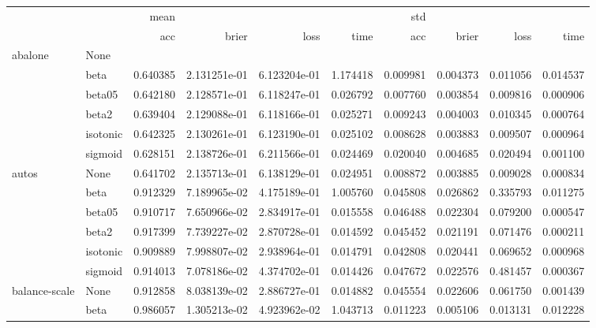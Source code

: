 \begin{tabular}{llrrrrrrrr}
\toprule
        &      &      mean &               &               &            &       std &           &           &           \\
        &      &       acc &         brier &          loss &       time &       acc &     brier &      loss &      time \\
\midrule
abalone & None &           &               &               &            &           &           &           &           \\
        & beta &  0.640385 &  2.131251e-01 &  6.123204e-01 &   1.174418 &  0.009981 &  0.004373 &  0.011056 &  0.014537 \\
        & beta05 &  0.642180 &  2.128571e-01 &  6.118247e-01 &   0.026792 &  0.007760 &  0.003854 &  0.009816 &  0.000906 \\
        & beta2 &  0.639404 &  2.129088e-01 &  6.118166e-01 &   0.025271 &  0.009243 &  0.004003 &  0.010345 &  0.000764 \\
        & isotonic &  0.642325 &  2.130261e-01 &  6.123190e-01 &   0.025102 &  0.008628 &  0.003883 &  0.009507 &  0.000964 \\
        & sigmoid &  0.628151 &  2.138726e-01 &  6.211566e-01 &   0.024469 &  0.020040 &  0.004685 &  0.020494 &  0.001100 \\
autos & None &  0.641702 &  2.135713e-01 &  6.138129e-01 &   0.024951 &  0.008872 &  0.003885 &  0.009028 &  0.000834 \\
        & beta &  0.912329 &  7.189965e-02 &  4.175189e-01 &   1.005760 &  0.045808 &  0.026862 &  0.335793 &  0.011275 \\
        & beta05 &  0.910717 &  7.650966e-02 &  2.834917e-01 &   0.015558 &  0.046488 &  0.022304 &  0.079200 &  0.000547 \\
        & beta2 &  0.917399 &  7.739227e-02 &  2.870728e-01 &   0.014592 &  0.045452 &  0.021191 &  0.071476 &  0.000211 \\
        & isotonic &  0.909889 &  7.998807e-02 &  2.938964e-01 &   0.014791 &  0.042808 &  0.020441 &  0.069652 &  0.000968 \\
        & sigmoid &  0.914013 &  7.078186e-02 &  4.374702e-01 &   0.014426 &  0.047672 &  0.022576 &  0.481457 &  0.000367 \\
balance-scale & None &  0.912858 &  8.038139e-02 &  2.886727e-01 &   0.014882 &  0.045554 &  0.022606 &  0.061750 &  0.001439 \\
        & beta &  0.986057 &  1.305213e-02 &  4.923962e-02 &   1.043713 &  0.011223 &  0.005106 &  0.013131 &  0.012228 \\

\end{tabular}
